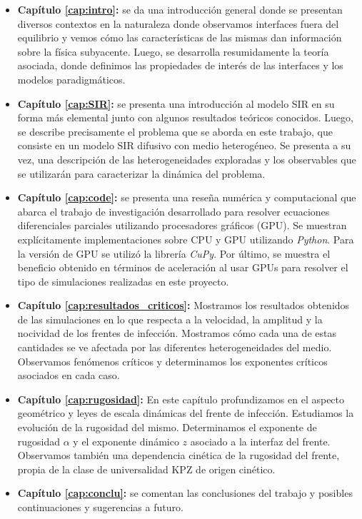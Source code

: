 \begin{itemize}
    \item \textbf{Capítulo \ref{cap:intro}:} se da una introducción general donde se presentan diversos contextos en la naturaleza donde observamos interfaces fuera del equilibrio y vemos cómo las características de las mismas dan información sobre la física subyacente. Luego, se desarrolla resumidamente la teoría asociada, donde definimos las propiedades de interés de las interfaces y los modelos paradigmáticos.
    \item \textbf{Capítulo \ref{cap:SIR}:} se presenta una introducción al modelo SIR en su forma más elemental junto con algunos resultados teóricos conocidos. Luego, se describe precisamente el problema que se aborda en este trabajo, que consiste en un modelo SIR difusivo con medio heterogéneo. Se presenta a su vez, una descripción de las heterogeneidades exploradas y los observables que se utilizarán para caracterizar la dinámica del problema.
    \item \textbf{Capítulo \ref{cap:code}:} se presenta una reseña numérica y computacional que abarca el trabajo de investigación desarrollado para resolver ecuaciones diferenciales parciales utilizando procesadores gráficos (GPU). Se muestran explícitamente implementaciones sobre CPU y GPU utilizando \textit{Python}. Para la versión de GPU se utilizó la librería \textit{CuPy}. Por último, se muestra el beneficio obtenido en términos de aceleración al usar GPUs para resolver el tipo de simulaciones realizadas en este proyecto.
    \item \textbf{Capítulo \ref{cap:resultados_criticos}:} Mostramos los resultados obtenidos de las simulaciones en lo que respecta a la velocidad, la amplitud y la nocividad de los frentes de infección. Mostramos cómo cada una de estas cantidades se ve afectada por las diferentes heterogeneidades del medio. Observamos fenómenos críticos y determinamos los exponentes críticos asociados en cada caso.
    \item \textbf{Capítulo \ref{cap:rugosidad}:} En este capítulo profundizamos en el aspecto geométrico y leyes de escala dinámicas del frente de infección. Estudiamos la evolución de la rugosidad del mismo. Determinamos el exponente de rugosidad $\alpha$ y el exponente dinámico $z$ asociado a la interfaz del frente. Observamos también una dependencia cinética de la rugosidad del frente, propia de la clase de universalidad KPZ de origen cinético. 
    \item \textbf{Capítulo \ref{cap:conclu}:} se comentan las conclusiones del trabajo y posibles continuaciones y sugerencias a futuro.
\end{itemize}